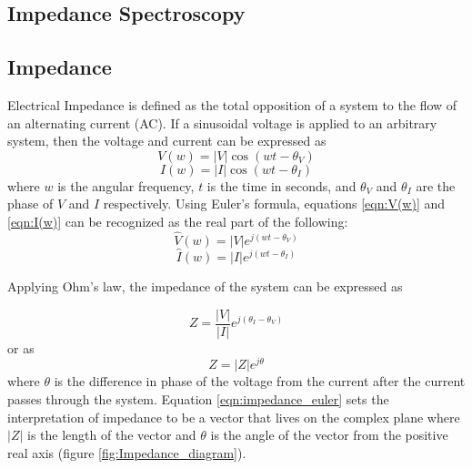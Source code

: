  \subsection{Impedance Spectroscopy}
 
 \subsection*{Impedance}
 \par Electrical Impedance is defined as the total opposition of a system to the flow of an alternating current (AC). If a sinusoidal voltage is applied to an arbitrary system, then the voltage and current can be expressed as
 \begin{equation}
    V(w) = |V|\cos(wt-\theta_V)
    \label{eqn:V(w)}
 \end{equation}
 \begin{equation}
    I(w) = |I|\cos(wt - \theta_I)
    \label{eqn:I(w)}
 \end{equation}
 \noindent where $w$ is the angular frequency, $t$ is the time in seconds, and $\theta_V$ and $\theta_I$ are the phase of $V$ and $I$ respectively. Using Euler's formula, equations \ref{eqn:V(w)} and \ref{eqn:I(w)} can be recognized as the real part of the following:
 \begin{equation}
    \hat{V}(w) = |V|e^{j(wt-\theta_V)}
 \end{equation}
 \begin{equation}
     \hat{I}(w) = |I|e^{j(wt-\theta_I)}
 \end{equation}
 
 \par Applying Ohm's law, the impedance of the system can be expressed as
 
 \begin{equation}
    Z = \frac{|V|}{|I|}e^{j(\theta_I-\theta_V)}
 \end{equation}
 \noindent or as 
 \begin{equation}
     Z = |Z|e^{j\theta}
     \label{eqn:impedance_euler}
 \end{equation}
 \noindent where $\theta$ is the difference in phase of the voltage from the current after the current passes through the system. Equation \ref{eqn:impedance_euler} sets the interpretation of impedance to be a vector that lives on the complex plane where $|Z|$ is the length of the vector and $\theta$ is the angle of the vector from the positive real axis (figure \ref{fig:Impedance_diagram}).
 
